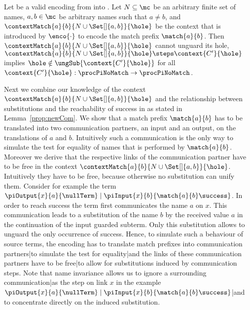 \documentclass[final,copyright,creativecommons]{eptcs}
\begin{document}
\begin{lemma}
	\label{lem:contextNotUnguardContinuation}
	Let \encod be a valid encoding from \piT into \piNM.
	Let $ N \subseteq \mc $ be an arbitrary finite set of names,
	$ a, b \in \mc $ be arbitrary names such that $ a \neq b $,
	and $ \contextMatch{a}{b}{N \cup \Set[]{ a, b }}{\hole} $ be the context that is introduced by $ \enco{\cdot} $ to encode the match prefix $ \match{a}{b} $. Then $ \contextMatch{a}{b}{N \cup \Set[]{ a, b }}{\hole} $ cannot unguard its hole, \ie $ \contextMatch{a}{b}{N \cup \Set[]{ a, b }}{\hole} \steps \context{C'}{\hole} $ implies $ \hole \notin \ungSub{\context{C'}{\hole}} $ for all $ \context{C'}{\hole} : \procPiNoMatch \to \procPiNoMatch $.
\end{lemma}

Next we combine our knowledge of the context $ \contextMatch{a}{b}{N \cup \Set[]{ a, b }}{\hole} $ and the relationship between substitutions and the reachability of success in \piNM as stated in Lemma~\ref{prop:newCom}. We show that a match prefix $ \match{a}{b} $ has to be translated into two communication partners, \ie an input and an output, on the translations of $ a $ and $ b $. Intuitively such a communication is the only way to simulate the test for equality of names that is performed by $ \match{a}{b} $. Moreover we derive that the respective links of the communication partner have to be free in the context $ \contextMatch{a}{b}{N \cup \Set[]{ a, b }}{\hole} $. Intuitively they have to be free, because otherwise no substitution can unify them. Consider for example the term $ \piOutput{x}{a}{\nullTerm} \mid \piInput{x}{b}{\match{a}{b}\success} $. In order to reach success the term first communicates the name $ a $ on $ x $. This communication leads to a substitution of the name $ b $ by the received value $ a $ in the continuation of the input guarded subterm. Only this substitution allows to unguard the only occurrence of success. Hence, to simulate such a behaviour of source terms, the encoding has to translate match prefixes into communication {partners}|{to} simulate the test for {equality}|{and} the links of these communication partners have to be {free}|{to} allow for substitutions induced by communication steps. Note that name invariance allows us to ignore a surrounding {communication}|{as} the step on link $ x $ in the example $ \piOutput{x}{a}{\nullTerm} \mid \piInput{x}{b}{\match{a}{b}\success} $|{and} to concentrate directly on the induced substitution.
\end{document}
